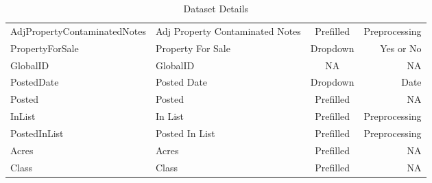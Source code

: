 \begin{table}[htbp]
{\begin{tabular}{|l|l|c|r|}
{\tiny AdjPropertyContaminatedNotes}&{\tiny Adj Property Contaminated Notes}&Prefilled&{\tiny Preprocessing}\\
PropertyForSale&Property For Sale&Dropdown&{\tiny Yes or No}\\
GlobalID&GlobalID&NA&NA\\
PostedDate&Posted Date&Dropdown&Date\\
Posted&Posted&Prefilled&NA\\
InList&In List&Prefilled&{\tiny Preprocessing}\\
PostedInList&Posted In List&Prefilled&{\tiny Preprocessing}\\
Acres&Acres&Prefilled&NA\\
Class&Class&Prefilled&NA\\
\hline
\end{tabular}
}
\caption{Dataset Details}
\end{table}
\clearpage
